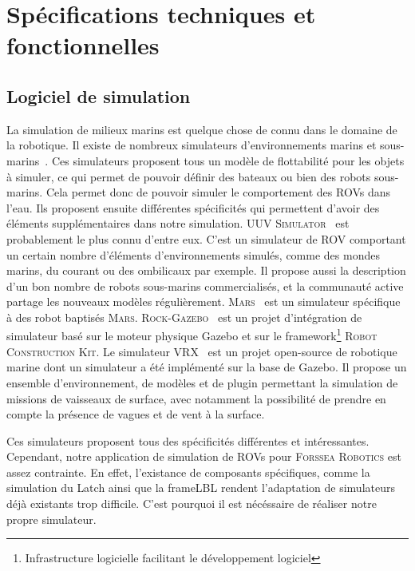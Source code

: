 \chapter{Spécifications techniques et fonctionnelles}

    \section{Logiciel de simulation}

        La simulation de milieux marins est quelque chose de connu dans le domaine de la robotique. Il existe de nombreux simulateurs d'environnements marins et sous-marins~\cite{Manhaes_2016, bingham19toward, MARS, Rock}. Ces simulateurs proposent tous un modèle de flottabilité pour les objets à simuler, ce qui permet de pouvoir définir des bateaux ou bien des robots sous-marins. Cela permet donc de pouvoir simuler le comportement des \gls{ROV}s dans l'eau. Ils proposent ensuite différentes spécificités qui permettent d'avoir des éléments supplémentaires dans notre simulation. \textsc{UUV Simulator}~\cite{Manhaes_2016} est probablement le plus connu d'entre eux. C'est un simulateur de \gls{ROV} comportant un certain nombre d'éléments d'environnements simulés, comme des mondes marins, du courant ou des ombilicaux par exemple. Il propose aussi la description d'un bon nombre de robots sous-marins commercialisés, et la communauté active partage les nouveaux modèles régulièrement. \textsc{Mars}~\cite{MARS} est un simulateur spécifique à des robot baptisés \textsc{Mars}. \textsc{Rock-Gazebo}~\cite{Rock} est un projet d'intégration de simulateur basé sur le moteur physique \gls{Gazebo} et sur le framework\footnote{Infrastructure logicielle facilitant le développement logiciel} \textsc{Robot Construction Kit}. Le simulateur \textsc{VRX}~\cite{bingham19toward} est un projet open-source de robotique marine dont un simulateur a été implémenté sur la base de \gls{Gazebo}. Il propose un ensemble d'environnement, de modèles et de plugin permettant la simulation de missions de vaisseaux de surface, avec notamment la possibilité de prendre en compte la présence de vagues et de vent à la surface.

        Ces simulateurs proposent tous des spécificités différentes et intéressantes. Cependant, notre application de simulation de \gls{ROV}s pour \textsc{Forssea Robotics} est assez contrainte. En effet, l'existance de composants spécifiques, comme la simulation du \gls{Latch} ainsi que la \gls{frameLBL} rendent l'adaptation de simulateurs déjà existants trop difficile. C'est pourquoi il est nécéssaire de réaliser notre propre simulateur.

